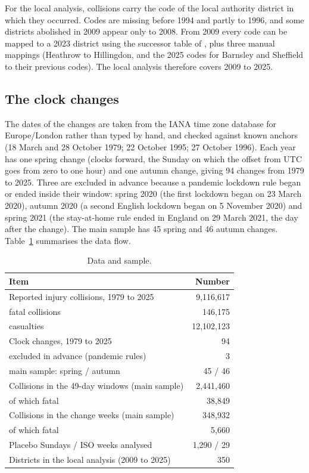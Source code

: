 \documentclass[11pt,a4paper]{article}
\begin{document}
For the local analysis, collisions carry the code of the local authority district in which they occurred. Codes are missing before 1994 and partly to 1996, and some districts abolished in 2009 appear only to 2008. From 2009 every code can be mapped to a 2023 district using the successor table of \citet{mysociety2026}, plus three manual mappings (Heathrow to Hillingdon, and the 2025 codes for Barnsley and Sheffield to their previous codes). The local analysis therefore covers 2009 to 2025.

\subsection{The clock changes}
The dates of the changes are taken from the IANA time zone database \citep{iana2026} for Europe/London rather than typed by hand, and checked against known anchors (18 March and 28 October 1979; 22 October 1995; 27 October 1996). Each year has one spring change (clocks forward, the Sunday on which the offset from UTC goes from zero to one hour) and one autumn change, giving 94 changes from 1979 to 2025. Three are excluded in advance because a pandemic lockdown rule began or ended inside their window: spring 2020 (the first lockdown began on 23 March 2020), autumn 2020 (a second English lockdown began on 5 November 2020) and spring 2021 (the stay-at-home rule ended in England on 29 March 2021, the day after the change). The main sample has 45 spring and 46 autumn changes. Table~\ref{tab:data} summarises the data flow.

\begin{table}[tbp]\centering\small\caption{Data and sample.}\label{tab:data}\begin{tabular}{lr}\toprule Item & Number\\\midrule
Reported injury collisions, 1979 to 2025 & 9,116,617\\
\quad fatal collisions & 146,175\\
\quad casualties & 12,102,123\\
Clock changes, 1979 to 2025 & 94\\
\quad excluded in advance (pandemic rules) & 3\\
\quad main sample: spring / autumn & 45 / 46\\
Collisions in the 49-day windows (main sample) & 2,441,460\\
\quad of which fatal & 38,849\\
Collisions in the change weeks (main sample) & 348,932\\
\quad of which fatal & 5,660\\
Placebo Sundays / ISO weeks analysed & 1,290 / 29\\
Districts in the local analysis (2009 to 2025) & 350\\
\bottomrule\end{tabular}\end{table}
\end{document}

